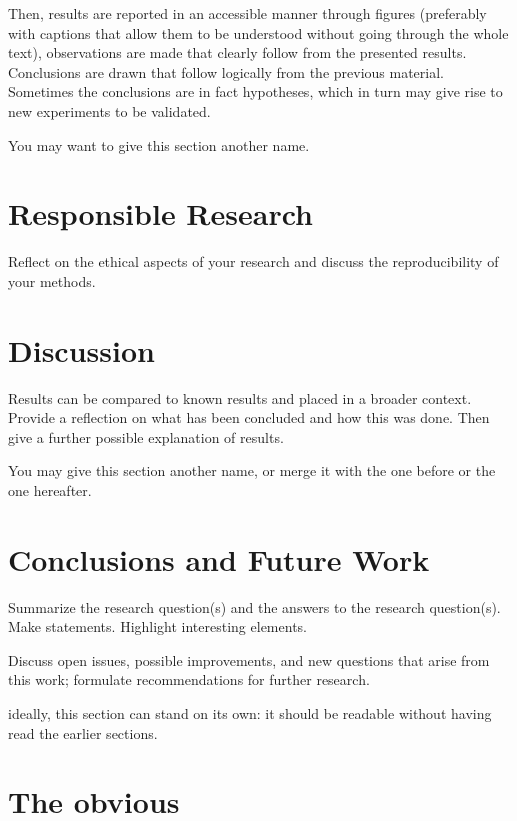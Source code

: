 \documentclass[english]{article}
\begin{document}
Then, results are reported in an accessible manner through figures (preferably with captions that allow them to be understood without going through the whole text), observations are made that clearly follow from the presented results.
Conclusions are drawn that follow logically from the previous material.
Sometimes the conclusions are in fact hypotheses, which in turn may give rise to new experiments to be validated.

You may want to give this section another name.

\section{Responsible Research}
Reflect on the ethical aspects of your research and discuss the reproducibility of your methods.

\section{Discussion}
Results can be compared to known results and placed in a broader context.
Provide a reflection on what has been concluded and how this was done.
Then give a further possible explanation of results.

You may give this section another name, or merge it with the one before or the one hereafter.

\section{Conclusions and Future Work}
Summarize the research question(s) and the answers to the research question(s).
Make statements.
Highlight interesting elements.

Discuss open issues, possible improvements, and new questions that arise from this work; formulate recommendations for further research.

ideally, this section can stand on its own: it should be readable without having read the earlier sections.

\appendix
\section{The obvious}
\end{document}
